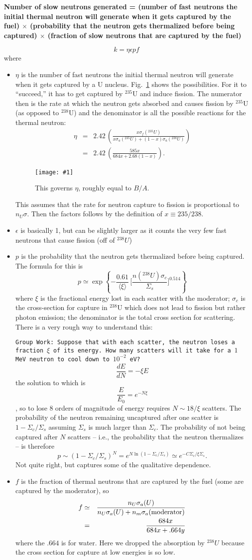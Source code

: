 \documentclass[11pt]{book}
\def\be{\begin{equation}}
\def\ee{\end{equation}}
\def\bea{\begin{eqnarray}}
\def\eea{\end{eqnarray}}
\newcommand{\vs}{\nonumber\\}
\newcommand{\sfig}[2]{
\texttt{[image: \#1]}
        }
\newcommand{\Sfig}[2]{
   \begin{figure}[thbp]
   \begin{center}
    \sfig{../Figures/#1.pdf}{0.7\columnwidth}
    \caption{{\small #2}}
    \label{fig:#1}
     \end{center}
   \end{figure}
}
\newcommand{\rf}[1]{\ref{fig:#1}}
\newcommand\group[1]{{\tt Group Work: #1}}
\newcommand\bei{\begin{itemize}}
\newcommand\eei{\end{itemize}}
\begin{document}
{\bf Number of slow neutrons generated = (number of fast neutrons the initial thermal neutron will generate when it gets captured by the fuel) $\times$ (probability that the neutron gets thermalized before being captured) $\times$ (fraction of slow neutrons that are captured by the fuel)}

\be
k=\eta\epsilon p f
\ee
where
\bei
\item $\eta$ is the number of fast neutrons the initial thermal neutron will generate when it gets captured by a U nucleus. Fig.~\rf{f191} shows the possibilities. For it to ``succeed,'' it has to get captured by $^{235}$U and induce fission. The numerator then is the rate at which the neutron gets absorbed and causes fission by $^{235}$U (as opposed to $^{238}$U) and the denominator is all the possible reactions for the thermal neutron:
\bea
\eta &=& 2.42\,\left( \frac{x\sigma_f(^{235}U)}{x\sigma_a(^{235}U) + (1-x)\sigma_a(^{238}U)}\right)
\vs
&=&
2.42\,\left( \frac{585x}{684x + 2.68(1-x)}
\right)
.\eea
\Sfig{f191}{This governs $\eta$, roughly equal to $B/A$.}
This assumes that the rate for neutron capture to fission is proportional to $n_U\sigma$. Then the factors follows by the definition of $x\equiv 235/238$.
\item $\epsilon$ is basically 1, but can be slightly larger as it counts the very few fast neutrons that cause fission (off of $^{238}U$)
\item $p$ is the probability that the neutron gets thermalized before being captured. The formula for this is
\be
p \simeq \exp\left\{-\frac{0.61}{\langle\xi\rangle}\,\Big[ \frac{n(^{238}U) \sigma_c}{\Sigma_s}\Big]^{0.514}
\right\}\ee
where $\xi$ is the fractional energy lost in each scatter with the moderator; $\sigma_c$ is the cross-section for capture in $^{238}$U which does not lead to fission but rather photon emission; the denominator is the total cross section for scattering. There is a very rough way to understand this: 

\group{Suppose that with each scatter, the neutron loses a fraction $\xi$ of its energy. How many scatters will it take for a $1$ MeV neutron to cool down to $10^{-2}$ eV?}
\be
\frac{dE}{dN} = -\xi E
\ee
the solution to which is \be
\frac{E}{E_0} = e^{-N\xi}\ee, so to lose 8 orders of magnitude of energy requires $N\sim 18/\xi$ scatters. The probability of the neutron remaining uncaptured after one scatter is 
$1-\Sigma_c/\Sigma_s$ assuming $\Sigma_s$ is much larger than $\Sigma_c$. The probability of not being captured after $N$ scatters -- i.e., the probability that the neutron thermalizes -- is therefore
\be
p \sim \left( 1-\Sigma_c/\Sigma_s\right)^N = e^{N\ln(1-\Sigma_c/\Sigma_s)} \simeq e^{-C \Sigma_c/\xi\Sigma_s} .\ee
Not quite right, but captures some of the qualitative dependence.
\item $f$ is the fraction of thermal neutrons that are captured by the fuel (some are captured by the moderator), so 
\bea
f  &\simeq &\frac{n_{U}\sigma_a(U)}{n_{U}\sigma_a(U) + n_m \sigma_a({\rm moderator})} \vs
&=& \frac{684x}{684x+.664y}
\eea
where the $.664$ is for water. Here we dropped the absorption by $^{238}U$ because the cross section for capture at low energies is so low.
\eei
\end{document}
